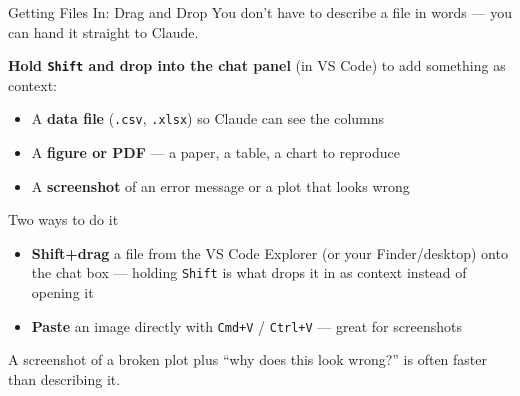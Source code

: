 \documentclass[aspectratio=169, 11pt]{beamer}
\begin{document}

\begin{frame}{Getting Files In: Drag and Drop}
  You don't have to describe a file in words --- you can hand it straight to Claude.

  \vspace{0.6em}
  \textbf{Hold \texttt{Shift} and drop into the chat panel} (in VS Code) to add something as context:
  \begin{itemize}
    \item A \textbf{data file} (\texttt{.csv}, \texttt{.xlsx}) so Claude can see the columns
    \item A \textbf{figure or PDF} --- a paper, a table, a chart to reproduce
    \item A \textbf{screenshot} of an error message or a plot that looks wrong
  \end{itemize}

  \vspace{0.5em}
  \begin{alertblock}{Two ways to do it}
    \begin{itemize}
      \item \textbf{Shift+drag} a file from the VS Code Explorer (or your Finder/desktop) onto the chat box --- holding \texttt{Shift} is what drops it in as context instead of opening it
      \item \textbf{Paste} an image directly with \texttt{Cmd+V} / \texttt{Ctrl+V} --- great for screenshots
    \end{itemize}
  \end{alertblock}

  \vspace{0.3em}
  {\small A screenshot of a broken plot plus ``why does this look wrong?'' is often faster than describing it.}
\end{frame}
\end{document}
